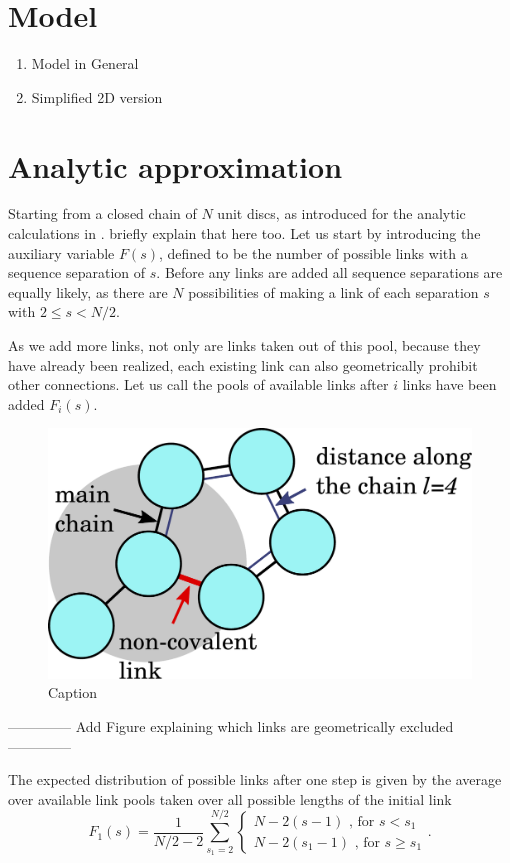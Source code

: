 \documentclass[reprint,amsmath,amssymb,rmp,onecolumn,notitlepage,11pt]{revtex4-1}
\newcommand{\red}[1]{\textcolor{red!80!black}{#1}}
\begin{document}


\section*{Model}
\begin{enumerate}
    \item Model in General
    \item Simplified 2D version
\end{enumerate}
\section*{Analytic approximation}
Starting from a closed chain of $N$ unit discs, as introduced for the analytic calculations in \cite{molkenthin2016scaling}. \red{briefly explain that here too.}
Let us start by introducing the auxiliary variable $F(s)$, defined to be the number of possible links with a sequence separation of $s$. Before any links are added all sequence separations are equally likely, as there are $N$ possibilities of making a link of each separation $s$ with $2\leq s < N/2$.

As we add more links, not only are links taken out of this pool, because they have already been realized, each existing link can also geometrically prohibit other connections.
Let us call the pools of available links after $i$ links have been added $F_i(s)$.
\begin{figure}
    \centering
    \includegraphics[width=0.5\columnwidth]{figures/prn_vis.pdf}
    \caption{Caption}
    \label{fig:fig_prn_vis}
\end{figure}

-------------- Add Figure explaining which links are geometrically excluded --------------

The expected distribution of possible links after one step is given by the average over available link pools taken over all possible lengths of the initial link
\begin{equation}
    F_1(s)= \frac{1}{N/2-2} \sum_{s_1=2}^{N/2} { \begin{cases}
    N-2(s-1) \text{ , for } s<s_1\\
    N-2(s_1 -1)\text{ , for } s\geq s_1
    \end{cases}}.
\end{equation}
\end{document}
